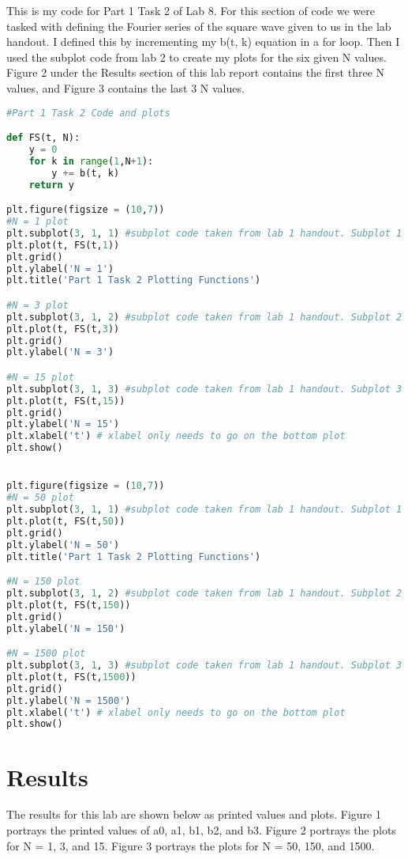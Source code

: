 \documentclass[12pt]{report}
\begin{document}
{This is my code for Part 1 Task 2 of Lab 8. For this section of code we were tasked with defining the Fourier series of the square wave given to us in the lab handout. I defined this by incrementing my b(t, k) equation in a for loop. Then I used the subplot code from lab 2 to create my plots for the six given N values. Figure 2 under the Results section of this lab report contains the first three N values, and Figure 3 contains the last 3 N values.  }
\begin{lstlisting}[language=Python]
#Part 1 Task 2 Code and plots

def FS(t, N):
    y = 0
    for k in range(1,N+1):
        y += b(t, k)
    return y

plt.figure(figsize = (10,7))
#N = 1 plot
plt.subplot(3, 1, 1) #subplot code taken from lab 1 handout. Subplot 1
plt.plot(t, FS(t,1))
plt.grid()
plt.ylabel('N = 1')
plt.title('Part 1 Task 2 Plotting Functions')

#N = 3 plot
plt.subplot(3, 1, 2) #subplot code taken from lab 1 handout. Subplot 2
plt.plot(t, FS(t,3))
plt.grid()
plt.ylabel('N = 3')

#N = 15 plot
plt.subplot(3, 1, 3) #subplot code taken from lab 1 handout. Subplot 3
plt.plot(t, FS(t,15))
plt.grid()
plt.ylabel('N = 15')
plt.xlabel('t') # xlabel only needs to go on the bottom plot
plt.show()


plt.figure(figsize = (10,7))
#N = 50 plot
plt.subplot(3, 1, 1) #subplot code taken from lab 1 handout. Subplot 1
plt.plot(t, FS(t,50))
plt.grid()
plt.ylabel('N = 50')
plt.title('Part 1 Task 2 Plotting Functions')

#N = 150 plot
plt.subplot(3, 1, 2) #subplot code taken from lab 1 handout. Subplot 2
plt.plot(t, FS(t,150))
plt.grid()
plt.ylabel('N = 150')

#N = 1500 plot
plt.subplot(3, 1, 3) #subplot code taken from lab 1 handout. Subplot 3
plt.plot(t, FS(t,1500))
plt.grid()
plt.ylabel('N = 1500')
plt.xlabel('t') # xlabel only needs to go on the bottom plot
plt.show()  
\end{lstlisting}

\newpage

\section{Results}

The results for this lab are shown below as printed values and plots. Figure 1 portrays the printed values of a0, a1, b1, b2, and b3. Figure 2 portrays the plots for N = 1, 3, and 15. Figure 3 portrays the plots for N = 50, 150, and 1500. 
\end{document}
